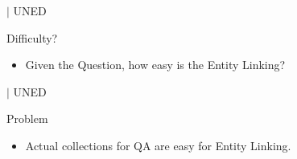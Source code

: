 \documentclass[]{beamer}
\newcommand{\mShortTitle}{\secname \hfill {\scriptsize$|$ UNED}}
\begin{document}
  \begin{frame}{\mShortTitle}
    \begin{alertblock}{Difficulty?}
      \begin{itemize}
        \item Given the Question, how easy is the Entity Linking?
      \end{itemize}
      
    \end{alertblock}
  \end{frame}
  \begin{frame}{\mShortTitle}
    \begin{alertblock}{Problem}
      \begin{itemize}
          \item Actual collections for QA are easy for Entity Linking.
      \end{itemize}
      
      \hfill
    \end{alertblock}
  \end{frame}
\end{document}
